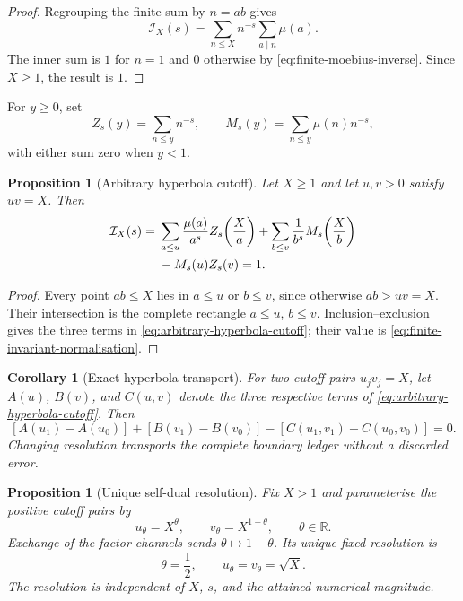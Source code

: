 \documentclass[11pt,a4paper]{article}
\newtheorem{proposition}[theorem]{Proposition}
\newtheorem{corollary}[theorem]{Corollary}
\theoremstyle{definition}
\newcommand{\Invariant}{\mathcal{I}}
\begin{document}
\begin{proof}
Regrouping the finite sum by $n=ab$ gives
\[
  \Invariant_X(s)
  =
  \sum_{n\leq X}n^{-s}\sum_{a\mid n}\mu(a).
\]
The inner sum is $1$ for $n=1$ and $0$ otherwise by
\cref{eq:finite-moebius-inverse}. Since $X\geq1$, the result is $1$.
\end{proof}

For $y\geq0$, set
\[
  Z_s(y)=\sum_{n\leq y}n^{-s},
  \qquad
  M_s(y)=\sum_{n\leq y}\mu(n)n^{-s},
\]
with either sum zero when $y<1$.

\begin{proposition}[Arbitrary hyperbola cutoff]
\label{prop:arbitrary-hyperbola-cutoff}
Let $X\geq1$ and let $u,v>0$ satisfy $uv=X$. Then
\begin{align}
  \Invariant_X(s)
  ={}&
  \sum_{a\leq u}\frac{\mu(a)}{a^s}
    Z_s\!\left(\frac Xa\right)
  +\sum_{b\leq v}\frac1{b^s}
    M_s\!\left(\frac Xb\right)\notag\\
  &-M_s(u)Z_s(v)
  =1.
\label{eq:arbitrary-hyperbola-cutoff}
\end{align}
\end{proposition}

\begin{proof}
Every point $ab\leq X$ lies in $a\leq u$ or $b\leq v$, since otherwise
$ab>uv=X$. Their intersection is the complete rectangle
$a\leq u$, $b\leq v$. Inclusion--exclusion gives the three terms in
\cref{eq:arbitrary-hyperbola-cutoff}; their value is
\cref{eq:finite-invariant-normalisation}.
\end{proof}

\begin{corollary}[Exact hyperbola transport]
\label{cor:exact-hyperbola-transport}
For two cutoff pairs $u_jv_j=X$, let $A(u)$, $B(v)$, and $C(u,v)$ denote the
three respective terms of \cref{eq:arbitrary-hyperbola-cutoff}. Then
\[
  [A(u_1)-A(u_0)]
  +[B(v_1)-B(v_0)]
  -[C(u_1,v_1)-C(u_0,v_0)]
  =0.
\]
Changing resolution transports the complete boundary ledger without a
discarded error.
\end{corollary}

\begin{proposition}[Unique self-dual resolution]
\label{prop:unique-self-dual-cutoff}
Fix $X>1$ and parameterise the positive cutoff pairs by
\[
  u_\theta=X^\theta,
  \qquad
  v_\theta=X^{1-\theta},
  \qquad
  \theta\in\mathbb R.
\]
Exchange of the factor channels sends $\theta\mapsto1-\theta$. Its unique fixed
resolution is
\begin{equation}
\label{eq:unique-self-dual-cutoff}
  \theta=\frac12,
  \qquad
  u_\theta=v_\theta=\sqrt X.
\end{equation}
The resolution is independent of $X$, $s$, and the attained numerical
magnitude.
\end{proposition}
\end{document}
